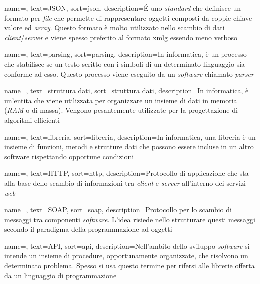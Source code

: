 {
    name=,
    text=JSON,
    sort=json,
    description={\'E uno \textit{standard} che definisce un formato per \textit{file} che permette di rappresentare oggetti composti da coppie chiave-valore ed \textit{array}. Questo formato è molto utilizzato nello scambio di dati \textit{client}/\textit{server} e viene spesso preferito al formato \gls{xmlg} essendo meno verboso}
}

{
    name=,
    text=parsing,
    sort=parsing,
    description={In informatica, è un processo che stabilisce se un testo scritto con i simboli di un determinato linguaggio sia conforme ad esso. Questo processo viene eseguito da un \textit{software} chiamato \textit{parser}}
}

{
    name=,
    text=struttura dati,
    sort=struttura dati,
    description={In informatica, è un'entita che viene utilizzata per organizzare un insieme di dati in memoria (\textit{RAM} o di massa). Vengono pesantemente utilizzate per la progettazione di algoritmi efficienti}
}

{
    name=,
    text=libreria,
    sort=libreria,
    description={In informatica, una libreria è un insieme di funzioni, metodi e strutture dati che possono essere incluse in un altro software rispettando opportune condizioni}
}

{
    name=,
    text=HTTP,
    sort=http,
    description={Protocollo di applicazione che sta alla base dello scambio di informazioni tra \textit{client} e \textit{server} all'interno dei servizi \textit{web}}
}

{
    name=,
    text=SOAP,
    sort=soap,
    description={Protocollo per lo scambio di messaggi tra componenti \textit{software}. L'idea risiede nello strutturare questi messaggi secondo il paradigma della programmazione ad oggetti}
}

{
    name=,
    text=API,
    sort=api,
    description={Nell'ambito dello sviluppo \textit{software} si intende un insieme di procedure, opportunamente organizzate, che risolvono un determinato problema. Spesso si usa questo termine per rifersi alle librerie offerta da un linguaggio di programmazione}
}


